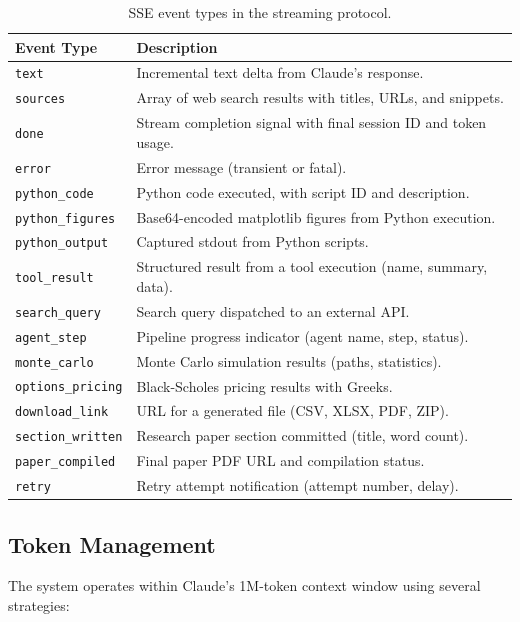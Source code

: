 \begin{table}[H]
\centering
\caption{SSE event types in the streaming protocol.}
\label{tab:sse-events}
\begin{tabularx}{\textwidth}{lX}
\toprule
\textbf{Event Type} & \textbf{Description} \\
\midrule
\texttt{text} & Incremental text delta from Claude's response. \\
\texttt{sources} & Array of web search results with titles, URLs, and snippets. \\
\texttt{done} & Stream completion signal with final session ID and token usage. \\
\texttt{error} & Error message (transient or fatal). \\
\texttt{python\_code} & Python code executed, with script ID and description. \\
\texttt{python\_figures} & Base64-encoded matplotlib figures from Python execution. \\
\texttt{python\_output} & Captured stdout from Python scripts. \\
\texttt{tool\_result} & Structured result from a tool execution (name, summary, data). \\
\texttt{search\_query} & Search query dispatched to an external API. \\
\texttt{agent\_step} & Pipeline progress indicator (agent name, step, status). \\
\texttt{monte\_carlo} & Monte Carlo simulation results (paths, statistics). \\
\texttt{options\_pricing} & Black-Scholes pricing results with Greeks. \\
\texttt{download\_link} & URL for a generated file (CSV, XLSX, PDF, ZIP). \\
\texttt{section\_written} & Research paper section committed (title, word count). \\
\texttt{paper\_compiled} & Final paper PDF URL and compilation status. \\
\texttt{retry} & Retry attempt notification (attempt number, delay). \\
\bottomrule
\end{tabularx}
\end{table}

\subsection{Token Management}

The system operates within Claude's 1M-token context window using several strategies:

